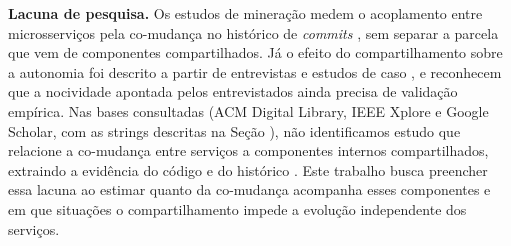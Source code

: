 \textbf{Lacuna de pesquisa.} Os estudos de mineração medem o acoplamento entre microsserviços pela co-mudança no histórico de \textit{commits} \cite{aragona2023,assuncao2023}, sem separar a parcela que vem de componentes compartilhados. Já o efeito do compartilhamento sobre a autonomia foi descrito a partir de entrevistas e estudos de caso \cite{taibi2018,detoledo2020,badampudi2025}, e  reconhecem que a nocividade apontada pelos entrevistados ainda precisa de validação empírica. Nas bases consultadas (ACM Digital Library, IEEE Xplore e Google Scholar, com as strings descritas na Seção ), não identificamos estudo que relacione a co-mudança entre serviços a componentes internos compartilhados, extraindo a evidência do código e do histórico . Este trabalho busca preencher essa lacuna ao estimar quanto da co-mudança acompanha esses componentes e em que situações o compartilhamento impede a evolução independente dos serviços.
